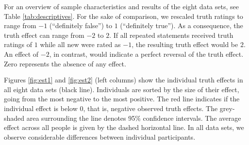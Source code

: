 \documentclass[
  english,
  ,man,floatsintext]{apa6}
\begin{document}
For an overview of sample characteristics and results of the eight data sets, see Table \ref{tab:descriptives}. For the sake of comparison, we rescaled truth ratings to range from \(-1\) (``definitely false'') to \(1\) (``definitely true''). As a consequence, the truth effect can range from \(-2\) to \(2\). If all repeated statements received truth ratings of \(1\) while all new were rated as \(-1\), the resulting truth effect would be \(2\). An effect of \(-2\), in contrast, would indicate a perfect reversal of the truth effect. Zero represents the absence of any effect.

Figures \ref{fig:est1} and \ref{fig:est2} (left columns) show the individual truth effects in all eight data sets (black line). Individuals are sorted by the size of their effect, going from the most negative to the most positive. The red line indicates if the individual effect is below 0, that is, negative observed truth effects. The grey-shaded area surrounding the line denotes 95\% confidence intervals. The average effect across all people is given by the dashed horizontal line. In all data sets, we observe considerable differences between individual participants.
\end{document}
